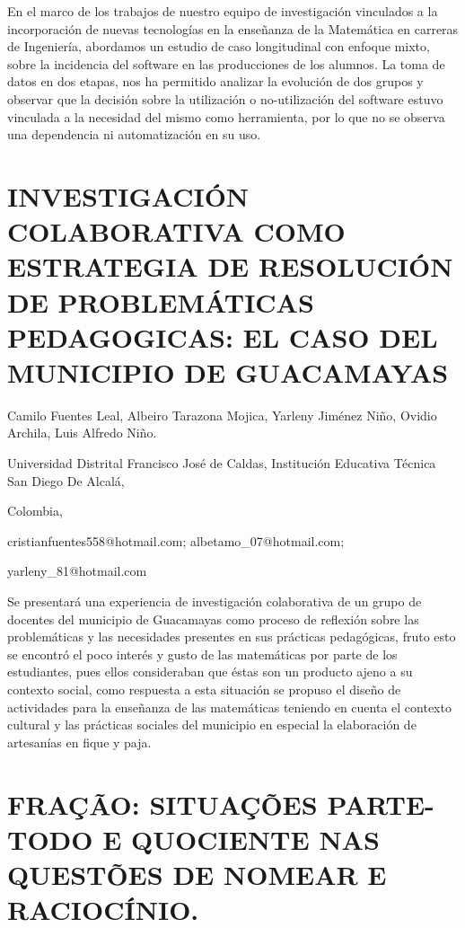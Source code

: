 En el marco de los trabajos de nuestro equipo de investigación vinculados
a la incorporación de nuevas tecnologías en la enseñanza de la Matemática
en carreras de Ingeniería, abordamos un estudio de caso longitudinal
con enfoque mixto, sobre la incidencia del software en las producciones
de los alumnos. La toma de datos en dos etapas, nos ha permitido analizar
la evolución de dos grupos y observar que la decisión sobre la utilización
o no-utilización del software estuvo vinculada a la necesidad del
mismo como herramienta, por lo que no se observa una dependencia ni
automatización en su uso.


\section{INVESTIGACIÓN COLABORATIVA COMO ESTRATEGIA DE RESOLUCIÓN DE PROBLEMÁTICAS
PEDAGOGICAS: EL CASO DEL MUNICIPIO DE GUACAMAYAS }

\begin{datos}

Camilo Fuentes Leal, Albeiro Tarazona Mojica, Yarleny Jiménez Niño,
Ovidio Archila, Luis Alfredo Niño.

Universidad Distrital Francisco José de Caldas, Institución Educativa
Técnica San Diego De Alcalá,

Colombia,

cristianfuentes558@hotmail.com; albetamo\_07@hotmail.com;

yarleny\_81@hotmail.com 

\end{datos}

Se presentará una experiencia de investigación colaborativa de un
grupo de docentes del municipio de Guacamayas como proceso de reflexión
sobre las problemáticas y las necesidades presentes en sus prácticas
pedagógicas, fruto esto se encontró el poco interés y gusto de las
matemáticas por parte de los estudiantes, pues ellos consideraban
que éstas son un producto ajeno a su contexto social, como respuesta
a esta situación se propuso el diseño de actividades para la enseñanza
de las matemáticas teniendo en cuenta el contexto cultural y las prácticas
sociales del municipio en especial la elaboración de artesanías en
fique y paja.


\section{FRAÇÃO: SITUAÇÕES PARTE-TODO E QUOCIENTE NAS QUESTÕES DE NOMEAR E
RACIOCÍNIO. }

